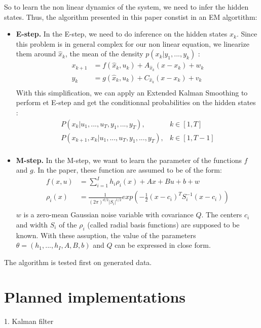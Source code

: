 \documentclass[11pt, oneside]{amsart}
\begin{document}
So to learn the non linear dynamics of the system, we need to infer the hidden states.
Thus, the algorithm presented in this paper constist in an EM algortithm:
\begin{itemize}
  \item \textbf{E-step.}
    In the E-step, we need to do inference on the hidden states $x_k$.
    Since this problem is in general complex for our non linear equation, we linearize them around $\hat{x}_k$, the mean of the density $p(x_k | y_1, ... , y_k)$ :
    \begin{align*}
      x_{k+1} &= f(\hat{x}_k, u_k) + A_{\hat{x}_k} (x - x_k) + w_k\\
      y_k &= g(\hat{x}_k, u_k) + C_{\hat{x}_k} (x - x_k) + v_k\\
    \end{align*}
    With this simplification, we can apply an Extended Kalman Smoothing to perform et E-step and get the conditionnal probabilities on the hidden states :
    \begin{align*}
      P(x_k |u_1, ..., u_T, y_1, ... , y_T),& k \in [1,T]\\
      P(x_{k+1}, x_k |u_1, ..., u_T, y_1, ... , y_T),& k \in [1,T-1]\\
    \end{align*}
  \item \textbf{M-step.}
    In the M-step, we want to learn the parameter of the functions $f$ and $g$.
    In the paper, these function are assumed to be of the form:
    \begin{align*}
      f(x,u) &= \sum_{i=1}^I h_i \rho_i(x) + Ax + Bu + b + w\\
      \rho_i(x) &= \frac{1}{(2\pi)^{d/2}|S_i|^{1/2}} exp\left(-\frac{1}{2}(x-c_i)^TS_i^{-1}(x-c_i)\right)\\
    \end{align*}
    $w$ is a zero-mean Gaussian noise variable with covariance $Q$.
    The centers $c_i$ and width $S_i$ of the $\rho_i$ (called radial basis functions) are supposed to be known.
    With these assuption, the value of the parameters $\theta = \left( h_1, ..., h_I, A, B, b\right)$ and $Q$ can be expressed in close form.
\end{itemize}

The algorithm is tested first on generated data.

\section{Planned implementations}

1. Kalman filter
\end{document}

